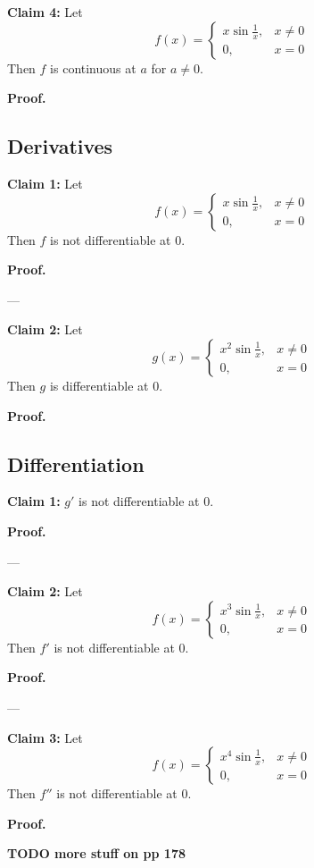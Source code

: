 \textbf{Claim 4:} Let
\[f(x)=\begin{cases}
  x\sin \frac{1}{x},&x\neq0\\
  0,&x=0
\end{cases}\]
Then $f$ is continuous at $a$ for $a\neq 0$.

\vs

\textbf{Proof.}


\subsection{Derivatives}

\textbf{Claim 1:} Let
\[f(x)=\begin{cases}
  x\sin \frac{1}{x},&x\neq0\\
  0,&x=0
\end{cases}\]
Then $f$ is not differentiable at $0$.

\vs

\textbf{Proof.}

\vs---\vs

\textbf{Claim 2:} Let
\[g(x)=\begin{cases}
  x^2\sin \frac{1}{x},&x\neq0\\
  0,&x=0
\end{cases}\]
Then $g$ is differentiable at $0$.

\vs

\textbf{Proof.}

\subsection{Differentiation}

\textbf{Claim 1:} $g'$ is not differentiable at $0$.

\textbf{Proof.}

\vs---\vs

\textbf{Claim 2:} Let
\[f(x)=\begin{cases}
  x^3\sin \frac{1}{x},&x\neq0\\
  0,&x=0
\end{cases}\]
Then $f'$ is not differentiable at $0$.

\vs

\textbf{Proof.}

\vs---\vs

\textbf{Claim 3:} Let
\[f(x)=\begin{cases}
  x^4\sin \frac{1}{x},&x\neq0\\
  0,&x=0
\end{cases}\]
Then $f''$ is not differentiable at $0$.

\vs

\textbf{Proof.}

\vs

\textbf{TODO more stuff on pp 178}

